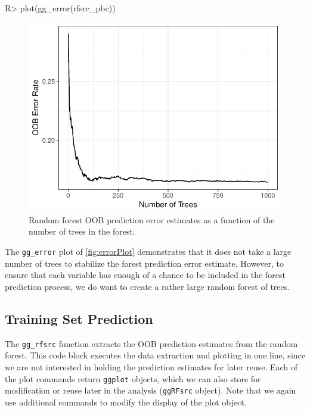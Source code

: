 \documentclass[article, nojss]{jss}
\begin{document}
\begin{Schunk}
\begin{Sinput}
R> plot(gg_error(rfsrc_pbc))
\end{Sinput}
\begin{figure}[!htb]

{\centering \includegraphics{rfs-errorPlot-1}

}

\caption[Random forest OOB prediction error estimates as a function of the number of trees in the forest]{Random forest OOB prediction error estimates as a function of the number of trees in the forest.}\label{fig:errorPlot}
\end{figure}
\end{Schunk}

The \texttt{gg\_error} plot of \autoref{fig:errorPlot} demonstrates that
it does not take a large number of trees to stabilize the forest
prediction error estimate. However, to ensure that each variable has
enough of a chance to be included in the forest prediction process, we
do want to create a rather large random forest of trees.

\subsection{Training Set Prediction}\label{training-set-prediction}

The \texttt{gg\_rfsrc} function extracts the OOB prediction estimates
from the random forest. This code block executes the data extraction and
plotting in one line, since we are not interested in holding the
prediction estimates for later reuse. Each of the 
plot commands return \texttt{ggplot} objects, which we can also store
for modification or reuse later in the analysis (\texttt{ggRFsrc}
object). Note that we again use additional  commands to
modify the display of the plot object.
\end{document}
